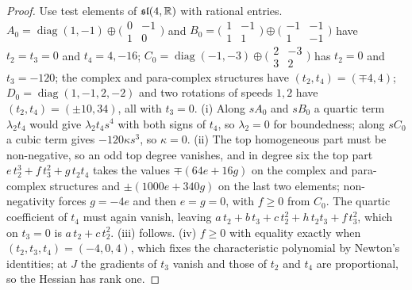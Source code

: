 \begin{proof}
Use test elements of $\mathfrak{sl}(4,\mathbb{R})$ with rational entries. $A_0=\operatorname{diag}(1,-1)\oplus\bigl(\begin{smallmatrix}0&-1\\1&0\end{smallmatrix}\bigr)$ and
$B_0=\bigl(\begin{smallmatrix}1&-1\\1&1\end{smallmatrix}\bigr)\oplus\bigl(\begin{smallmatrix}-1&-1\\1&-1\end{smallmatrix}\bigr)$ have $t_2=t_3=0$ and $t_4=4,-16$;
$C_0=\operatorname{diag}(-1,-3)\oplus\bigl(\begin{smallmatrix}2&-3\\3&2\end{smallmatrix}\bigr)$ has $t_2=0$ and $t_3=-120$; the complex and para-complex structures have
$(t_2,t_4)=(\mp4,4)$; $D_0=\operatorname{diag}(1,-1,2,-2)$ and two rotations of speeds $1,2$ have $(t_2,t_4)=(\pm10,34)$, all with $t_3=0$. (i) Along $sA_0$ and $sB_0$ a quartic
term $\lambda_2t_4$ would give $\lambda_2t_4s^4$ with both signs of $t_4$, so $\lambda_2=0$ for boundedness; along $sC_0$ a cubic term gives $-120\kappa s^3$, so $\kappa=0$. (ii) The top
homogeneous part must be non-negative, so an odd top degree vanishes, and in degree six the top part $e\,t_2^3+f\,t_3^2+g\,t_2t_4$ takes the values $\mp(64e+16g)$ on the
complex and para-complex structures and $\pm(1000e+340g)$ on the last two elements; non-negativity forces $g=-4e$ and then $e=g=0$, with $f\ge0$ from $C_0$. The quartic
coefficient of $t_4$ must again vanish, leaving $a\,t_2+b\,t_3+c\,t_2^2+h\,t_2t_3+f\,t_3^2$, which on $t_3=0$ is $a\,t_2+c\,t_2^2$. (iii) follows. (iv) $f\ge0$ with equality exactly
when $(t_2,t_3,t_4)=(-4,0,4)$, which fixes the characteristic polynomial by Newton's identities; at $J$ the gradients of $t_3$ vanish and those of $t_2$ and $t_4$ are
proportional, so the Hessian has rank one.
\end{proof}

